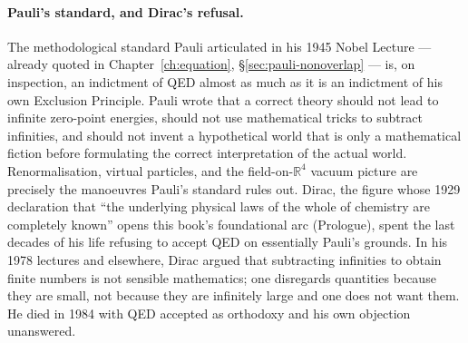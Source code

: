 \paragraph{Pauli's standard, and Dirac's refusal.}
The methodological standard Pauli articulated in his 1945 Nobel Lecture --- already quoted in Chapter~\ref{ch:equation}, \S\ref{sec:pauli-nonoverlap} --- is, on inspection, an indictment of QED almost as much as it is an indictment of his own Exclusion Principle. Pauli wrote that a correct theory should not lead to infinite zero-point energies, should not use mathematical tricks to subtract infinities, and should not invent a hypothetical world that is only a mathematical fiction before formulating the correct interpretation of the actual world. Renormalisation, virtual particles, and the field-on-$\mathbb{R}^4$ vacuum picture are precisely the manoeuvres Pauli's standard rules out. Dirac, the figure whose 1929 declaration that ``the underlying physical laws of the whole of chemistry are completely known'' opens this book's foundational arc (Prologue), spent the last decades of his life refusing to accept QED on essentially Pauli's grounds. In his 1978 lectures and elsewhere, Dirac argued that subtracting infinities to obtain finite numbers is not sensible mathematics; one disregards quantities because they are small, not because they are infinitely large and one does not want them. He died in 1984 with QED accepted as orthodoxy and his own objection unanswered.

